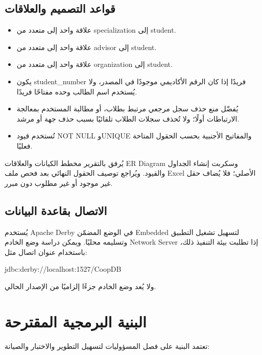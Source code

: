 \documentclass[12pt,a4paper]{article}
\begin{document}
\subsection{قواعد التصميم والعلاقات}
\begin{itemize}
\item علاقة واحد إلى متعدد من \textenglish{specialization} إلى \textenglish{student}.
\item علاقة واحد إلى متعدد من \textenglish{advisor} إلى \textenglish{student}.
\item علاقة واحد إلى متعدد من \textenglish{organization} إلى \textenglish{student}.
\item يكون \textenglish{student\_number} فريدًا إذا كان الرقم الأكاديمي موجودًا في المصدر، ولا يُستخدم اسم الطالب وحده مفتاحًا فريدًا.
\item يُفضّل منع حذف سجل مرجعي مرتبط بطلاب، أو مطالبة المستخدم بمعالجة الارتباطات أولًا؛ ولا تُحذف سجلات الطلاب تلقائيًا بسبب حذف جهة أو مرشد.
\item تُستخدم قيود \textenglish{NOT NULL} و\textenglish{UNIQUE} والمفاتيح الأجنبية بحسب الحقول المتاحة فعليًا.
\end{itemize}

يُرفق بالتقرير مخطط الكيانات والعلاقات \textenglish{ER Diagram} وسكربت إنشاء الجداول والقيود. ويُراجع توصيف الحقول النهائي بعد فحص ملف Excel الأصلي؛ فلا يُضاف حقل غير موجود أو غير مطلوب دون مبرر.

\subsection{الاتصال بقاعدة البيانات}
يُستخدم Apache Derby في الوضع المضمّن \textenglish{Embedded} لتسهيل تشغيل التطبيق وتسليمه محليًا. ويمكن دراسة وضع الخادم \textenglish{Network Server} إذا تطلبت بيئة التنفيذ ذلك، باستخدام عنوان اتصال مثل:
\begin{center}
\textenglish{\small jdbc:derby://localhost:1527/CoopDB}
\end{center}
ولا يُعد وضع الخادم جزءًا إلزاميًا من الإصدار الحالي.

\section{البنية البرمجية المقترحة}
تعتمد البنية على فصل المسؤوليات لتسهيل التطوير والاختبار والصيانة:
\end{document}
